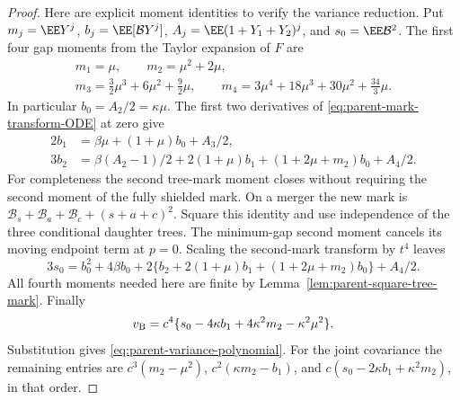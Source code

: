 \documentclass[11pt,letterpaper]{article}
\begin{document}
\begin{proof}
Here are explicit moment identities to verify the variance
reduction. Put $m_j=\EE Y^j$, $b_j=\EE[\mathcal B Y^j]$,
$A_j=\EE(1+Y_1+Y_2)^j$, and $s_0=\EE\mathcal B^2$.
The first four gap moments from the Taylor expansion of $F$ are
\[
 \begin{gathered}
 m_1=\mu,\qquad m_2=\mu^2+2\mu,\\
 m_3=\tfrac32\mu^3+6\mu^2+\tfrac92\mu,\qquad
 m_4=3\mu^4+18\mu^3+30\mu^2+\tfrac{34}{3}\mu.
 \end{gathered}
\]
In particular $b_0=A_2/2=\kappa\mu$.
The first two derivatives of
\eqref{eq:parent-mark-transform-ODE} at zero give
\begin{align*}
 2b_1&=\beta\mu+(1+\mu)b_0+A_3/2,\\
 3b_2&=\beta(A_2-1)/2+2(1+\mu)b_1
                            +(1+2\mu+m_2)b_0+A_4/2.
\end{align*}
For completeness the second tree-mark moment closes without
requiring the second moment of the fully shielded mark.
On a merger the new mark is
$\mathcal B_s+\mathcal B_a+\mathcal B_c+(s+a+c)^2$.
Square this identity and use independence of the three conditional
daughter trees. The minimum-gap second moment cancels its moving
endpoint term at $p=0$. Scaling the second-mark transform by
$t^4$ leaves
\[
 3s_0=b_0^2+4\beta b_0
       +2\{b_2+2(1+\mu)b_1+(1+2\mu+m_2)b_0\}+A_4/2.
\]
All fourth moments needed here are finite by
Lemma~\ref{lem:parent-square-tree-mark}.
Finally
\[
 v_{\rm B}=c^4\{s_0-4\kappa b_1
                           +4\kappa^2m_2-\kappa^2\mu^2\}.
\]
Substitution gives \eqref{eq:parent-variance-polynomial}.
For the joint covariance the remaining entries are
$c^3(m_2-\mu^2)$, $c^2(\kappa m_2-b_1)$, and
$c(s_0-2\kappa b_1+\kappa^2m_2)$, in that order.
\end{proof}
\end{document}
